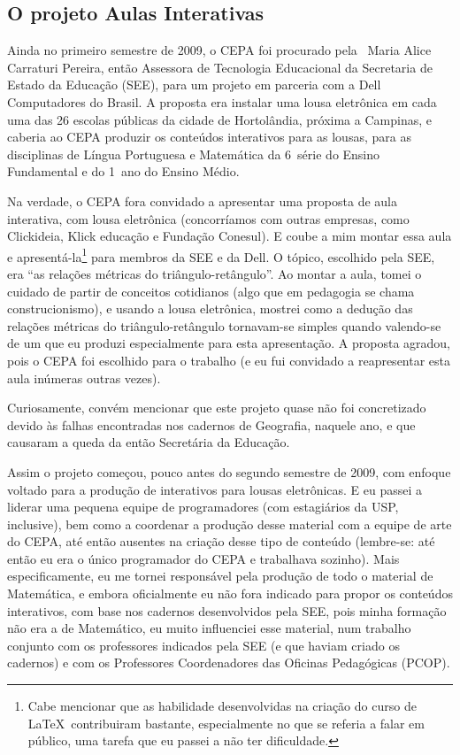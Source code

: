 \subsection{O projeto Aulas Interativas}
\label{sec:aulas-interativas}

Ainda no primeiro semestre de 2009, o CEPA foi procurado pela \profa\ Maria Alice Carraturi Pereira, então Assessora de Tecnologia Educacional da Secretaria de Estado da Educação (SEE), para um projeto em parceria com a Dell Computadores do Brasil. A proposta era instalar uma lousa eletrônica em cada uma das 26 escolas públicas da cidade de Hortolândia, próxima a Campinas, e caberia ao CEPA produzir os conteúdos interativos para as lousas, para as disciplinas de Língua Portuguesa e Matemática da 6\textordfeminine\ série do Ensino Fundamental e do 1\textordmasculine\ ano do Ensino Médio.

Na verdade, o CEPA fora convidado a apresentar uma proposta de aula interativa, com lousa eletrônica (concorríamos com outras empresas, como Clickideia, Klick educação e Fundação Conesul). E coube a mim montar essa aula e apresentá-la\footnote{Cabe mencionar que as habilidade desenvolvidas na criação do curso de \LaTeX\ contribuiram bastante, especialmente no que se referia a falar em público, uma tarefa que eu passei a não ter dificuldade.} para membros da SEE e da Dell. O tópico, escolhido pela SEE, era ``as relações métricas do triângulo-retângulo''. Ao montar a aula, tomei o cuidado de partir de conceitos cotidianos (algo que em pedagogia se chama construcionismo), e usando a lousa eletrônica, mostrei como a dedução das relações métricas do triângulo-retângulo tornavam-se simples quando valendo-se de um  que eu produzi especialmente para esta apresentação. A proposta agradou, pois o CEPA foi escolhido para o trabalho (e eu fui convidado a reapresentar esta aula inúmeras outras vezes).

Curiosamente, convém mencionar que este projeto quase não foi concretizado devido às falhas encontradas nos cadernos de Geografia, naquele ano, e que causaram a queda da então Secretária da Educação.

Assim o projeto começou, pouco antes do segundo semestre de 2009, com enfoque voltado para a produção de  interativos para lousas eletrônicas. E eu passei a liderar uma pequena equipe de programadores (com estagiários da USP, inclusive), bem como a coordenar a produção desse material com a equipe de arte do CEPA, até então ausentes na criação desse tipo de conteúdo (lembre-se: até então eu era o único programador do CEPA e trabalhava sozinho). Mais especificamente, eu me tornei responsável pela produção de todo o material de Matemática, e embora oficialmente eu não fora indicado para propor os conteúdos interativos, com base nos cadernos desenvolvidos pela SEE, pois minha formação não era a de Matemático, eu muito influenciei esse material, num trabalho conjunto com os professores indicados pela SEE (e que haviam criado os cadernos) e com os Professores Coordenadores das Oficinas Pedagógicas (PCOP).


